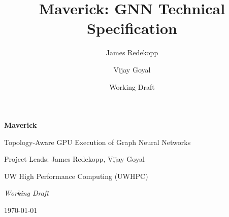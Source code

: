 \documentclass[11pt,letterpaper]{article}
\title{Maverick: GNN Technical Specification}
\author{James Redekopp \and Vijay Goyal}
\date{Working Draft}
\begin{document}
\hypersetup{pageanchor=false}
\begin{titlepage}
  \centering
  \vspace*{3cm}

  {\Huge\bfseries Maverick\par}
  \vspace{1cm}
  {\Large Topology-Aware GPU Execution of Graph Neural Networks\par}

  \vspace{3cm}
  {\large Project Leads: James Redekopp, Vijay Goyal\par}
  \vspace{0.5cm}
  {\large UW High Performance Computing (UWHPC)\par}

  \vfill

  {\large\itshape Working Draft\par}
  \vspace{0.5cm}
  {\large \today\par}

\end{titlepage}
\hypersetup{pageanchor=true}

\tableofcontents
\newpage
{}







\printbibliography
\end{document}
